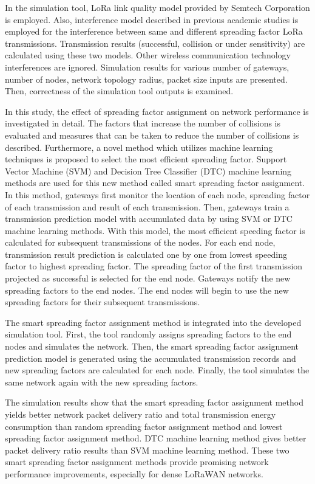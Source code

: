 In the simulation tool, LoRa link quality model provided by Semtech Corporation is employed. Also, interference model described in previous academic studies is employed for the interference between same and different spreading factor LoRa transmissions. Transmission results (successful, collision or under sensitivity) are calculated using these two models. Other wireless communication technology interferences are ignored. Simulation results for various number of gateways, number of nodes, network topology radius, packet size inputs are presented. Then, correctness of the simulation tool outputs is examined.

In this study, the effect of spreading factor assignment on network performance is investigated in detail. The factors that increase the number of collisions is evaluated and measures that can be taken to reduce the number of collisions is described. Furthermore, a novel method which utilizes machine learning techniques is proposed to select the most efficient spreading factor. Support Vector Machine (SVM) and Decision Tree Classifier (DTC) machine learning methods are used for this new method called smart spreading factor assignment. In this method, gateways first monitor the location of each node, spreading factor of each transmission and result of each transmission. Then, gateways train a transmission prediction model with accumulated data by using SVM or DTC machine learning methods. With this model, the most efficient speeding factor is calculated for subsequent transmissions of the nodes. For each end node, transmission result prediction is calculated one by one from lowest speeding factor to highest spreading factor. The spreading factor of the first transmission projected as successful is selected for the end node. Gateways notify the new spreading factors to the end nodes. The end nodes will begin to use the new spreading factors for their subsequent transmissions.

The smart spreading factor assignment method is integrated into the developed simulation tool. First, the tool randomly assigns spreading factors to the end nodes and simulates the network. Then, the smart spreading factor assignment prediction model is generated using the accumulated transmission records and new spreading factors are calculated for each node. Finally, the tool simulates the same network again with the new spreading factors.

The simulation results show that the smart spreading factor assignment method yields better network packet delivery ratio and total transmission energy consumption than random spreading factor assignment method and lowest spreading factor assignment method. DTC machine learning method gives better packet delivery ratio results than SVM machine learning method. These two smart spreading factor assignment methods provide promising network performance improvements, especially for dense LoRaWAN networks.
